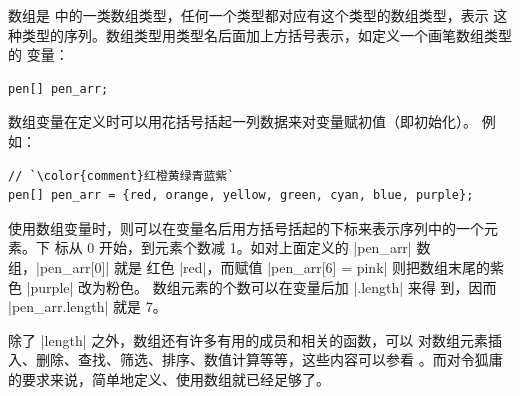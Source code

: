 数组是 \Asy{} 中的一类数组类型，任何一个类型都对应有这个类型的数组类型，表示
这种类型的序列。数组类型用类型名后面加上方括号表示，如定义一个画笔数组类型的
变量：
\begin{lstlisting}
pen[] pen_arr;
\end{lstlisting}
数组变量在定义时可以用花括号括起一列数据来对变量赋初值（即初始化）。
例如：
\begin{lstlisting}
// `\color{comment}红橙黄绿青蓝紫`
pen[] pen_arr = {red, orange, yellow, green, cyan, blue, purple};
\end{lstlisting}
使用数组变量时，则可以在变量名后用方括号括起的下标来表示序列中的一个元素。下
标从 0 开始，到元素个数减 1。如对上面定义的 |pen_arr| 数组，|pen_arr[0]| 就是
红色 |red|，而赋值 |pen_arr[6] = pink| 则把数组末尾的紫色 |purple| 改为粉色。
数组元素的个数可以在变量后加 |.length|
 来得
到，因而 |pen_arr.length| 就是 7。

除了 |length| 之外，数组还有许多有用的成员和相关的函数，可以
对数组元素插入、删除、查找、筛选、排序、数值计算等等，这些内容可以参看
\cite{asyman}。而对令狐庸的要求来说，简单地定义、使用数组就已经足够了。

